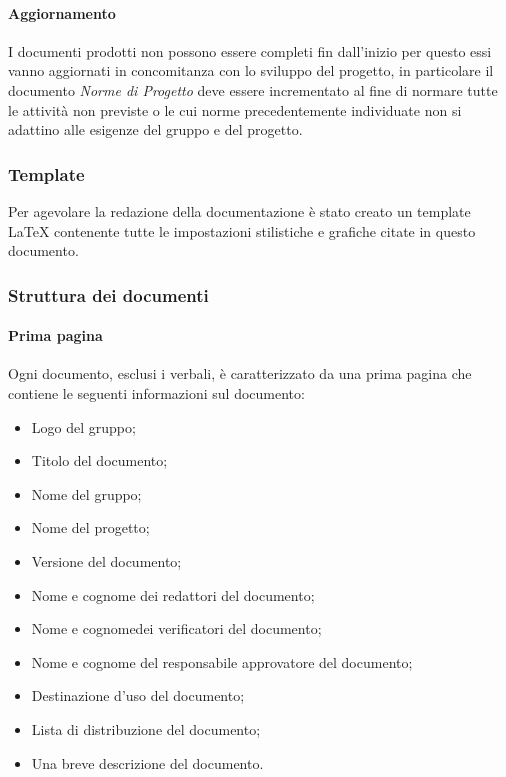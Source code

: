 \paragraph{Aggiornamento} \Spazio 
I documenti prodotti non possono essere completi fin dall'inizio per questo essi vanno aggiornati in concomitanza con lo sviluppo del progetto, in particolare il documento \textit{Norme di Progetto} deve essere incrementato al fine di normare tutte le attività non previste o le cui norme precedentemente individuate non si adattino alle esigenze del gruppo e del progetto. 


\subsubsection{Template}
Per agevolare la redazione della documentazione è stato creato un template \LaTeX\text{ } contenente tutte le impostazioni stilistiche e grafiche citate in questo documento.

\subsubsection{Struttura dei documenti}
\label{struttura}

\paragraph{Prima pagina}\Spazio
Ogni documento, esclusi i verbali, è caratterizzato da una prima pagina che contiene le seguenti informazioni sul documento:
\begin{itemize}
	\item Logo del gruppo;
	\item Titolo del documento;
	\item Nome del gruppo;
	\item Nome del progetto;
	\item Versione del documento;
	\item Nome e cognome dei redattori del documento;
	\item Nome e cognomedei verificatori del documento;
	\item Nome e cognome del responsabile approvatore del documento;
	\item Destinazione d’uso del documento;
	\item Lista di distribuzione del documento;
	\item Una breve descrizione del documento.
\end{itemize}

